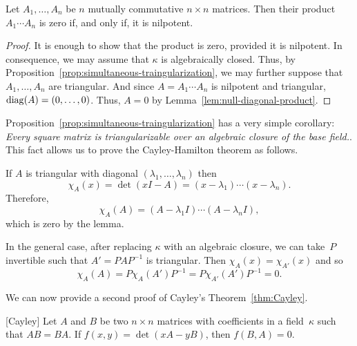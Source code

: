 \begin{thm}\label{thm:nilpotent-n-product}
    Let\/ $A_1,\dots,A_n$ be\/ $n$ mutually commutative\/ $n\times n$ matrices. Then their product\/ $A_1\cdots A_n$ is zero if, and only if, it is nilpotent. 
\end{thm}

\begin{proof}
    It is enough to show that the product is zero, provided it is nilpotent. In consequence, we may assume that $\kappa$ is algebraically closed. Thus, by Proposition~\ref{prop:simultaneous-traingularization}, we may further suppose that $A_1,\dots,A_n$ are triangular. And since $A=A_1\cdots A_n$ is nilpotent and triangular, ${\operatorname{diag}}(A)=(0,\dots,0)$. Thus, $A=0$ by Lemma~\ref{lem:null-diagonal-product}.
\end{proof}

\begin{rem}
    Proposition~\ref{prop:simultaneous-traingularization} has a very simple corollary: \textit{Every square matrix is triangularizable over an algebraic closure of the base field.}. This fact allows us to prove the Cayley-Hamilton theorem as follows.

    If $A$ is triangular with diagonal $(\lambda_1,\dots,\lambda_n)$ then
    $$
        \chi_A(x) = \det(xI-A)
            = (x-\lambda_1)\cdots(x-\lambda_n).
    $$
    Therefore,
    $$
        \chi_A(A) = (A-\lambda_1I)\cdots(A-\lambda_nI),
    $$
    which is zero by the lemma.
    
    In the general case, after replacing $\kappa$ with an algebraic closure, we can take~$P$ invertible such that $A'=PAP^{-1}$ is triangular. Then $\chi_A(x)=\chi_{A'}(x)$ and so
    $$
        \chi_A(A)=P\chi_A(A')P^{-1}
            =P\chi_{A'}(A')P^{-1} = 0.
    $$
\end{rem}

\bigskip

We can now provide a second proof of Cayley's Theorem~\ref{thm:Cayley}.

\begin{thm}\label{thm:Cayley-2} {\rm [Cayley]}
    Let\/ $A$ and\/ $B$ be two\/ $n\times n$ matrices with coefficients in a field~$\kappa$ such that\/ $AB=BA$. If\/ $f(x,y)=\det(xA-yB)$, then\/ $f(B,A)=0$.
\end{thm}

